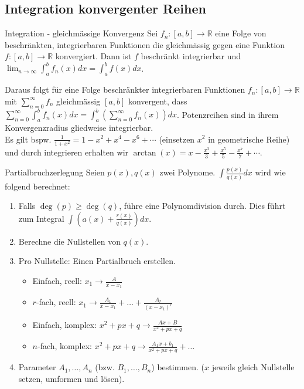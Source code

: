 \documentclass[a4paper,10pt]{article}
\def\limn{\lim_{n\to \infty}}
\def\sumn{\sum_{n=0}^\infty}
\begin{document}
\subsection{Integration konvergenter Reihen}
\begin{subbox}{Integration - gleichmässige Konvergenz}
  Sei $f_n: [a, b] \to \mathbb{R}$ eine Folge von beschränkten, integrierbaren Funktionen die gleichmässig gegen eine Funktion $f: [a, b] \to \mathbb{R}$ konvergiert. Dann ist $f$ beschränkt integrierbar und $\limn \int_a^b f_n(x)dx = \int_a^b f(x)dx$.
\end{subbox}
Daraus folgt für eine Folge beschränkter integrierbaren Funktionen $f_n: [a, b] \to \mathbb{R}$ mit $\sumn f_n$ gleichmässig $[a, b]$ konvergent, dass $\sumn \int_a^b f_n(x)dx = \int_a^b (\sumn f_n(x))dx$. Potenzreihen sind in ihrem Konvergenzradius gliedweise integrierbar.\\
Es gilt bspw. $\frac{1}{1 + x^2} = 1 - x^2 + x^4 - x^6 + \cdots$ (einsetzen $x^2$ in geometrische Reihe) und durch integrieren erhalten wir $\arctan(x) = x - \frac{x^3}{3} + \frac{x^5}{5} - \frac{x^7}{7} + \cdots$.

\begin{mainbox}{Partialbruchzerlegung}
 Seien $p(x), q(x)$ zwei Polynome. $\int \frac{p(x)}{q(x)} dx$ wird wie folgend berechnet:
 \begin{enumerate}
  \item Falls $\deg(p) \ge \deg(q)$, führe eine Polynomdivision durch. Dies führt zum Integral $\int (a(x) + \frac{r(x)}{q(x)})dx$.
  \item Berechne die Nullstellen von $q(x)$.
  \item Pro Nullstelle: Einen Partialbruch erstellen.
  \begin{itemize}[left=0pt]
   \item Einfach, reell: $x_1 \to \frac{A}{x - x_1}$
   \item $r$-fach, reell: $x_1 \to \frac{A_1}{x - x_1} + \ldots + \frac{A_r}{(x-x_1)^r}$ 
   \item Einfach, komplex: $x^2 + px + q \to \frac{Ax + B} {x^2 + px + q}$
   \item $n$-fach, komplex: $x^2 + px + q \to \frac{A_1x+b_1}{x^2+px+q} + \ldots$
  \end{itemize}
  \item Parameter $A_1, \ldots, A_n$ (bzw. $B_1, \ldots, B_n$) bestimmen. ($x$ jeweils gleich Nullstelle setzen, umformen und lösen).

 \end{enumerate}
\end{mainbox}
\end{document}
